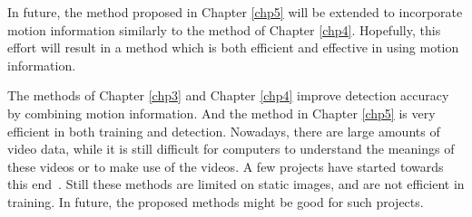 In future, the method proposed in Chapter \ref{chp5} will be extended to incorporate motion information similarly to the method of Chapter \ref{chp4}. Hopefully, this effort will result in a method which is both efficient and effective in using motion information.

The methods of Chapter \ref{chp3} and Chapter \ref{chp4} improve detection accuracy by combining motion information. And the method in Chapter \ref{chp5} is very efficient in both training and detection. Nowadays, there are large amounts of video data, while it is still difficult for computers to understand the meanings of these videos  or to make  use of the videos. A few projects have started towards this end~\citep{Chen_2013_ICCV,catbrain}. Still these methods are limited on static images, and are not efficient in training. In future, the proposed methods might be good for such projects. 